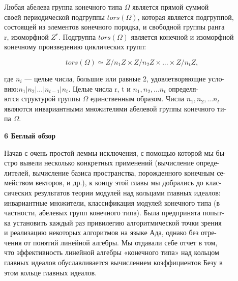 \documentclass{../template/mai_book}
\begin{document}
Любая абелева группа конечного типа $\Omega$ является прямой суммой\\ 
своей периодической подгруппы $tors(\Omega)$, которая является подгруппой,\\ 
состоящей из элементов конечного порядка, и свободной группы ранга\\
r, изоморфной $Z^r$. Подгруппа $tors(\Omega)$ является конечной и изоморфной\\ 
конечному произведению циклических групп: 

\medskip

$$ tors(\Omega)\simeq Z/n_1Z\times Z/n_2Z\times...\times Z/n_tZ, $$ 

\medskip

где $n_i$ — целые числа, большие или равные 2, удовлетворяющие 
усло-\\вию:$n_1|n_2|...|n_{t-1}|n_t$. Целые числа r, t и $n_1,n_2,... n_t$ 
определя-\\ются структурой группы $\Omega$ единственным образом. Числа $n_1,n_2,... n_t$ \\
являются инвариантными множителями абелевой группы конечного 
ти-\\па $\Omega$.

\pagebreak

{\noindent \bf\Huge6 Беглый обзор} 

\medskip

\noindent  Начав с очень простой леммы исключения, с помощью которой мы 
бы-\\стро вывели несколько конкретных применений (вычисление 
опреде-\\лителей, вычисление базиса пространства, порожденного конечным 
се-\\мейством векторов, и др.), к концу этой главы мы добрались до 
клас-\\сических результатов теории модулей над кольцами главных идеалов: \\
инвариантные множители, классификация модулей конечного типа (в\\ 
частности, абелевых групп конечного типа). Была предпринята 
попыт-\\ка установить каждый раз привилегию алгоритмической точки зрения\\ 
и реализацию некоторых алгоритмов на языке Ада, однако без 
отре-\\чения от понятий линейной алгебры. Мы отдавали себе отчет в том,\\
что эффективность линейной алгебры «конечного типа» над кольцом\\ 
главных идеалов обуславливается вычислением коэффициентов Безу в\\ 
этом кольце главных идеалов. 
\end{document}
